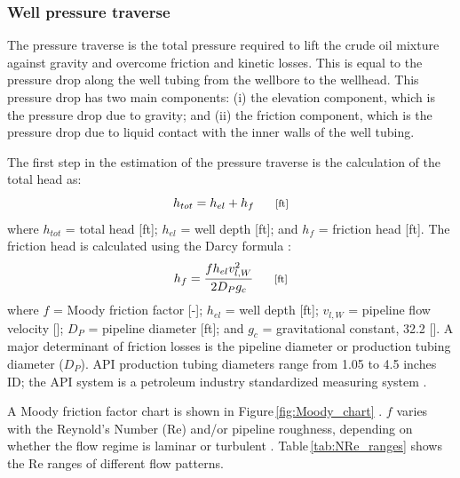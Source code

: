 \documentclass[11pt]{report}
\newcommand{\marg}[1]{{\footnotesize\textit{\textcolor{stanford}{'#1'}}}}
\newcommand{\marginnote}[1]{\marginpar{\marg{#1}}}
\begin{document}
\subsubsection{Well pressure traverse}

The pressure traverse is the total pressure required to lift the crude oil mixture against gravity and overcome friction and kinetic losses. This is equal to the pressure drop along the well tubing from the wellbore to the wellhead. This pressure drop has two main components: (i) the elevation component, which is the pressure drop due to gravity; and (ii) the friction component, which is the pressure drop due to liquid contact with the inner walls of the well tubing.


The first step in the estimation of the pressure traverse is the calculation of the total head as: \marginnote{Production \& Extraction 1.2.2,2.2.1} 
\begin{equation} \label{eq:total_head}
h_{tot}= h_{el} + h_{f} \begin{footnotesize} \quad\quad\text{[ft]} \end{footnotesize}
\end{equation}
where $h_{tot}$ = total head [\unit{ft}]; $h_{el}$ = well depth [\unit{ft}]; and $h_{f}$ = friction head [\unit{ft}]. The friction head is calculated using the Darcy formula \cite[p. 447]{Mcallister2009}:
\begin{equation} \label{eq:friction_head}
h_{f}=\frac{fh_{el}{v_{l,W}^2}}{2D_{P}{g_{c}}} \begin{footnotesize} \quad\quad\text{[ft]} \end{footnotesize}
\end{equation}
where $f$ = Moody friction factor [-]; $h_{el}$ = well depth [\unit{ft}]; $v_{l,W}$ = pipeline flow velocity []; $D_{P}$ = pipeline diameter [\unit{ft}]; and $g_{c}$ = gravitational constant, 32.2 []. A major determinant of friction losses is the pipeline diameter or production tubing diameter ($D_{P}$). API production tubing diameters range from 1.05 to 4.5 inches ID; the API system is a petroleum industry standardized measuring system \cite[p. 106]{Clegg2007}.


A Moody friction factor chart is shown in Figure\,\ref{fig:Moody_chart} \cite{Moody2008}. $f$ varies with the Reynold's Number (Re) and/or pipeline roughness, depending on whether the flow regime is laminar or turbulent \cite[p. 481]{Mcallister2009}. Table\,\ref{tab:NRe_ranges} shows the Re ranges of different flow patterns. 
\end{document}
